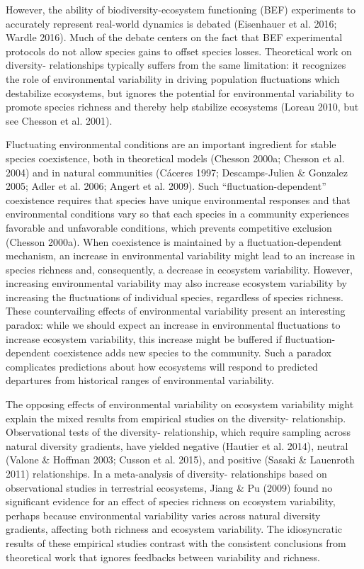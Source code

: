 \documentclass[12pt,]{article}
\begin{document}
However, the ability of biodiversity-ecosystem functioning (BEF)
experiments to accurately represent real-world dynamics is debated
(Eisenhauer et al. 2016; Wardle 2016). Much of the debate centers on the
fact that BEF experimental protocols do not allow species gains to
offset species losses. Theoretical work on
diversity- relationships typically suffers
from the same limitation: it recognizes the role of environmental
variability in driving population fluctuations which destabilize
ecosystems, but ignores the potential for environmental variability to
promote species richness and thereby help stabilize ecosystems (Loreau
2010, but see Chesson et al. 2001).

Fluctuating environmental conditions are an important ingredient for
stable species coexistence, both in theoretical models (Chesson 2000a;
Chesson et al. 2004) and in natural communities (Cáceres 1997;
Descamps-Julien \& Gonzalez 2005; Adler et al. 2006; Angert et al.
2009). Such ``fluctuation-dependent'' coexistence requires that species
have unique environmental responses and that environmental conditions
vary so that each species in a community experiences favorable and
unfavorable conditions, which prevents competitive exclusion (Chesson
2000a). When coexistence is maintained by a fluctuation-dependent
mechanism, an increase in environmental variability might lead to an
increase in species richness and, consequently, a decrease in ecosystem
variability. However, increasing environmental variability may also
increase ecosystem variability by increasing the fluctuations of
individual species, regardless of species richness. These countervailing
effects of environmental variability present an interesting paradox:
while we should expect an increase in environmental fluctuations to
increase ecosystem variability, this increase might be buffered if
fluctuation-dependent coexistence adds new species to the community.
Such a paradox complicates predictions about how ecosystems will respond
to predicted departures from historical ranges of environmental
variability.

The opposing effects of environmental variability on ecosystem
variability might explain the mixed results from empirical studies on
the diversity- relationship. Observational
tests of the diversity- relationship, which
require sampling across natural diversity gradients, have yielded
negative (Hautier et al. 2014), neutral (Valone \& Hoffman 2003; Cusson
et al. 2015), and positive (Sasaki \& Lauenroth 2011) relationships. In
a meta-analysis of diversity- relationships
based on observational studies in terrestrial ecosystems, Jiang \& Pu
(2009) found no significant evidence for an effect of species richness
on ecosystem variability, perhaps because environmental variability
varies across natural diversity gradients, affecting both richness and
ecosystem variability. The idiosyncratic results of these empirical
studies contrast with the consistent conclusions from theoretical work
that ignores feedbacks between variability and richness.
\end{document}
